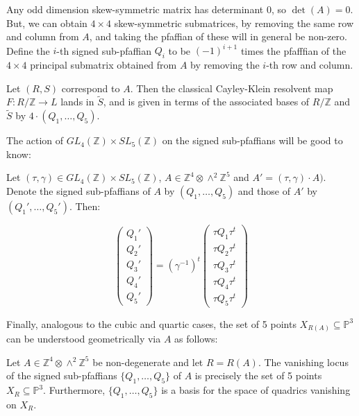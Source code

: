 \documentclass{report}
\begin{document}
Any odd dimension skew-symmetric matrix has determinant 0, so $\det(A) = 0$.  But, we can obtain $4 \times 4$ skew-symmetric submatrices, by removing the same row and column from $A$, and taking the pfaffian of these will in general be non-zero.  Define the $i$-th signed sub-pfaffian $Q_i$ to be $(-1)^{i+1}$ times the pfafffian of the $4 \times 4$ principal submatrix obtained from $A$ by removing the $i$-th row and column.

\begin{theorem} [Bhargava]
Let $(R,S)$ correspond to $A$.  Then the classical Cayley-Klein resolvent map $F : R / \mathbb{Z} \to L$ lands in $\tilde{S}$, and is given in terms of the associated bases of $R / \mathbb{Z}$ and $\tilde{S}$ by $4 \cdot (Q_1,\ldots,Q_5)$.
\end{theorem}

The action of $GL_4(\mathbb{Z}) \times SL_5(\mathbb{Z})$ on the signed sub-pfaffians will be good to know:
\begin{lemma}[Bhargava]
Let $(\tau,\gamma) \in GL_4(\mathbb{Z}) \times SL_5(\mathbb{Z})$, $A \in \mathbb{Z}^4 \otimes \wedge^2 \mathbb{Z}^5$ and $A' = (\tau,\gamma) \cdot A)$.  Denote the signed sub-pfaffians of $A$ by $(Q_1,\ldots,Q_5)$ and those of $A'$ by $(Q_1',\ldots,Q_5')$.  Then:

\begin{equation}
\begin{pmatrix}
Q_1' \\ Q_2' \\ Q_3' \\ Q_4' \\ Q_5'
\end{pmatrix}
=
(\gamma^{-1})^t
\begin{pmatrix}
\tau Q_1 \tau^t \\ \tau Q_2 \tau^t \\ \tau Q_3 \tau^t \\ \tau Q_4 \tau^t \\ \tau Q_5 \tau^t
\end{pmatrix}
\end{equation}
\end{lemma}

Finally, analogous to the cubic and quartic cases, the set of 5 points $X_{R(A)} \subseteq \mathbb{P}^3$ can be understood geometrically via $A$ as follows:
\begin{prop}[Bhargava] \label{X_R quintic}
Let $A \in \mathbb{Z}^4 \otimes \wedge^2 \mathbb{Z}^5$ be non-degenerate and let $R = R(A)$.  The vanishing locus of the signed sub-pfaffians $\{Q_1,\ldots,Q_5\}$ of $A$ is precisely the set of 5 points $X_R \subseteq \mathbb{P}^3$.  Furthermore, $\{Q_1,\ldots,Q_5\}$ is a basis for the space of quadrics vanishing on $X_R$.
\end{prop}
\end{document}
